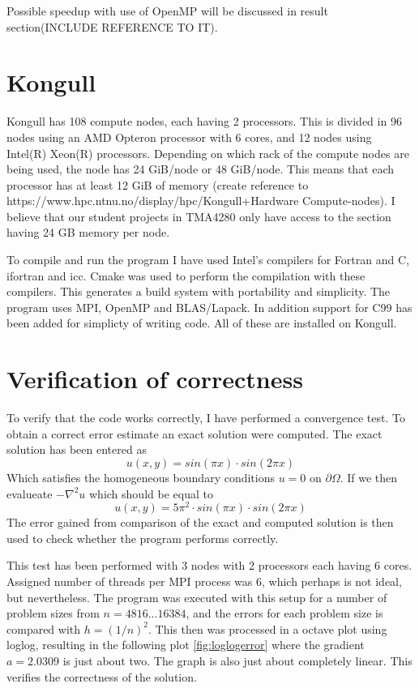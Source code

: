 Possible speedup with use of OpenMP will be discussed in result section(INCLUDE REFERENCE TO IT). 



\section{Kongull}
Kongull has 108 compute nodes, each having 2 processors. This is divided in 96 nodes using an AMD Opteron processor with 6 cores, and 12 nodes using Intel(R) Xeon(R) processors. Depending on which rack of the compute nodes are being used, the node has 24 GiB/node or 48 GiB/node. This means that each processor has at least 12 GiB of memory (create reference to https://www.hpc.ntnu.no/display/hpc/Kongull+Hardware Compute-nodes). I believe that our student projects in TMA4280 only have access to the section having 24 GB memory per node. 

To compile and run the program I have used Intel's compilers for Fortran and C, ifortran and icc. Cmake was used to perform the compilation with these compilers. This generates a build system with portability and simplicity. 
The program uses MPI, OpenMP and BLAS/Lapack. In addition support for C99 has been added for simplicty of writing code.
All of these are installed on Kongull.


\section{Verification of correctness}
To verify that the code works correctly, I have performed a convergence test. To obtain a correct error estimate an exact solution were computed. The exact solution has been entered as 
\begin{equation}
	u(x,y) = sin(\pi x) \cdot sin(2\pi x)
\end{equation}
Which satisfies the homogeneous boundary conditions $u = 0 \text{ on } \partial\Omega$. If we then evalueate $-\nabla^2 u$ which should be equal to 
\begin{equation}
	u(x,y) = 5\pi^2 \cdot sin(\pi x) \cdot sin(2\pi x)
\end{equation}
The error gained from comparison of the exact and computed solution is then used to check whether the program performs correctly.

This test has been performed with 3 nodes with 2 processors each having 6 cores. Assigned number of threads per MPI process was 6, which perhaps is not ideal, but nevertheless. The program was executed with this setup for a number of problem sizes from $n=4 8 16 ...16384$, and the errors for each problem size is compared with $h=(1 / n)^2$. This then was processed in a octave plot using loglog, resulting in the following plot \ref{fig:loglogerror} where the gradient $a = 2.0309$ is just about two. The graph is also just about completely linear. This verifies the correctness of the solution. 

